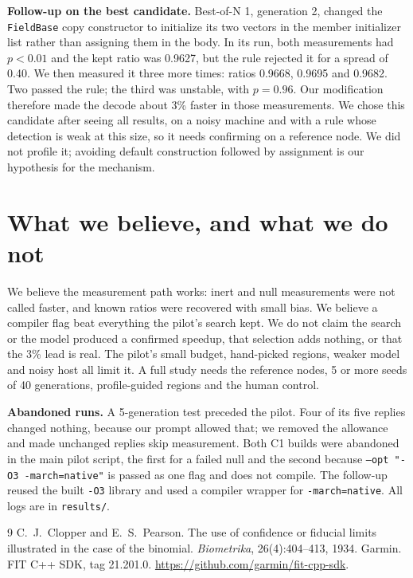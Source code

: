 \documentclass[10pt,twocolumn]{article}
\begin{document}
\textbf{Follow-up on the best candidate.} Best-of-N 1, generation 2, changed the
\texttt{FieldBase} copy constructor to initialize its two vectors in the member
initializer list rather than assigning them in the body. In its run, both
measurements had $p<0.01$ and the kept ratio was 0.9627, but the rule rejected it
for a spread of 0.40. We then measured it three more times: ratios 0.9668, 0.9695
and 0.9682. Two passed the rule; the third was unstable, with $p=0.96$. Our
modification therefore made the decode about 3\% faster in those measurements. We
chose this candidate after seeing all results, on a noisy machine and with a rule
whose detection is weak at this size, so it needs confirming on a reference node. We
did not profile it; avoiding default construction followed by assignment is our
hypothesis for the mechanism.

\section{What we believe, and what we do not}
We believe the measurement path works: inert and null measurements were not called
faster, and known ratios were recovered with small bias. We believe a compiler flag
beat everything the pilot's search kept. We do not claim the search or the model
produced a confirmed speedup, that selection adds nothing, or that the 3\% lead is
real. The pilot's small budget, hand-picked regions, weaker model and noisy host all
limit it. A full study needs the reference nodes, 5 or more seeds of 40 generations,
profile-guided regions and the human control.

\textbf{Abandoned runs.} A 5-generation test preceded the pilot. Four of its five
replies changed nothing, because our prompt allowed that; we removed the allowance
and made unchanged replies skip measurement. Both C1 builds were abandoned in the
main pilot script, the first for a failed null and the second because
\texttt{--opt "-O3 -march=native"} is passed as one flag and does not compile. The
follow-up reused the built \texttt{-O3} library and used a compiler wrapper for
\texttt{-march=native}. All logs are in \texttt{results/}.

\footnotesize
\begin{thebibliography}{9}\setlength{\itemsep}{0pt}
 C.~J.~Clopper and E.~S.~Pearson. The use of confidence or fiducial
limits illustrated in the case of the binomial. \emph{Biometrika}, 26(4):404--413, 1934.
 Garmin. FIT C++ SDK, tag 21.201.0.
\url{https://github.com/garmin/fit-cpp-sdk}.
\end{thebibliography}
\end{document}

